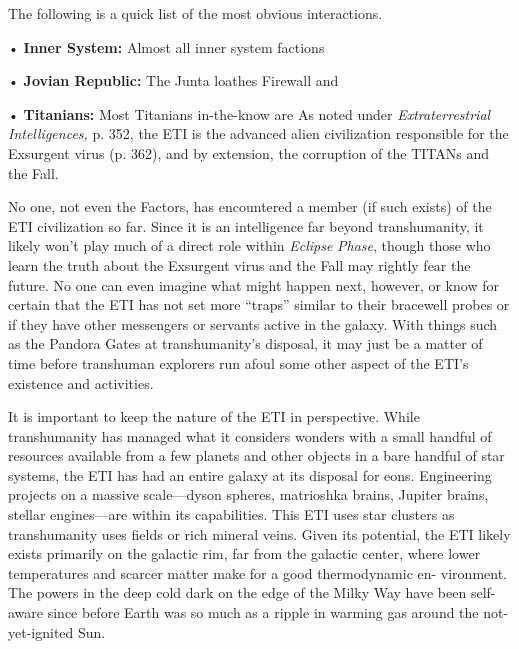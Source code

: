 The following is a quick list of the most obvious 
interactions. 

•  \textbf{Inner System:} Almost all inner system factions 

•  \textbf{Jovian Republic:} The Junta loathes Firewall and 

•  \textbf{Titanians:} Most Titanians in-the-know are 
As noted under \textit{Extraterrestrial Intelligences,} p. 352, 
the ETI is the advanced alien civilization responsible 
for the Exsurgent virus (p. 362), and by extension, 
the corruption of the TITANs and the Fall.

No one, not even the Factors, has encountered a 
member (if such exists) of the ETI civilization so far. 
Since it is an intelligence far beyond transhumanity, it 
likely won't play much of a direct role within \textit{Eclipse }
\textit{Phase}, though those who learn the truth about the 
Exsurgent virus and the Fall may rightly fear the 
future. No one can even imagine what might happen 
next, however, or know for certain that the ETI has 
not set more ``traps'' similar to their bracewell probes 
or if they have other messengers or servants active in 
the galaxy. With things such as the Pandora Gates 
at transhumanity's disposal, it may just be a matter 
of time before transhuman explorers run afoul some 
other aspect of the ETI's existence and activities.

It is important to keep the nature of the ETI in 
perspective. While transhumanity has managed 
what it considers wonders with a small handful of 
resources available from a few planets and other 
objects in a bare handful of star systems, the ETI 
has had an entire galaxy at its disposal for eons. 
Engineering projects on a massive scale—dyson 
spheres, matrioshka brains, Jupiter brains, stellar 
engines—are within its capabilities. This ETI uses 
star clusters as transhumanity uses fields or rich 
mineral veins. Given its potential, the ETI likely 
exists primarily on the galactic rim, far from the 
galactic center, where lower temperatures and 
scarcer matter make for a good thermodynamic en-
vironment. The powers in the deep cold dark on the 
edge of the Milky Way have been self-aware since 
before Earth was so much as a ripple in warming 
gas around the not-yet-ignited Sun. 

